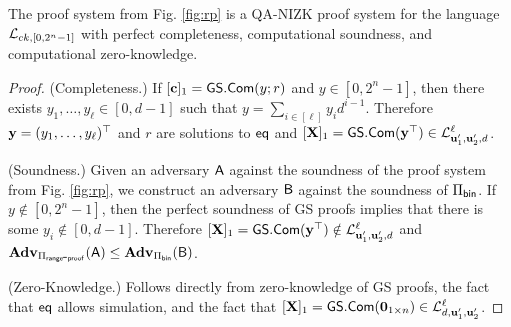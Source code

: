 \begin{theorem} \label{theo:rp}
The proof system from Fig. \ref{fig:rp} is a QA-NIZK proof system for the language $\mathcal{L}_{ck,[0,2^n-1]}$ with perfect completeness, computational soundness, and computational zero-knowledge.
\end{theorem}
\begin{proof}
(Completeness.)
If $[\mathbf{c}]_1={\mathsf{GS}}.\mathsf{Com}(y;r)$ and $y\in[0,2^n-1]$, then there exists $y_1,\ldots,y_\ell\in[0,d-1]$  such that $y=\sum_{i\in[\ell]}y_id^{i-1}$. Therefore $\mathbf{y}=(y_1,\ldots,y_\ell)^\top$ and $r$ are solutions to $\mathsf{eq}$ and $[\mathbf{{X}}]_1={\mathsf{GS}}.\mathsf{Com}(\mathbf{y}^\top)\in\mathcal{L}_{\mathbf{u}'_1,\mathbf{u}'_2,d}^\ell$.

(Soundness.)
Given an adversary $\mathsf{A}$ against the soundness of the proof system from Fig. \ref{fig:rp}, we construct an adversary $\mathsf{B}$ against the soundness of $\Pi_{\mathsf{bin}}$. If $y\notin[0,2^n-1]$, then the perfect soundness of GS proofs implies that there is some $y_i\notin[0,d-1]$. Therefore $[\mathbf{{X}}]_1={\mathsf{GS}}.\mathsf{Com}(\mathbf{y}^\top)\notin\mathcal{L}_{\mathbf{u}'_1,\mathbf{u}'_2,d}^\ell$ and $\mathbf{Adv}_{\Pi_{\mathsf{range}\mbox{-}\mathsf{proof}}}(\mathsf{A})\leq\mathbf{Adv}_{\Pi_{\mathsf{bin}}}(\mathsf{B})$.

(Zero-Knowledge.) Follows directly from zero-knowledge of GS proofs, the fact that $\mathsf{eq}$ allows simulation, and the fact that $[\mathbf{{X}}]_1={\mathsf{GS}}.\mathsf{Com}(\mathbf{{0}}_{1\times n})\in\mathcal{L}_{d,\mathbf{u}'_1,\mathbf{u}'_2}^\ell$.
\end{proof}
